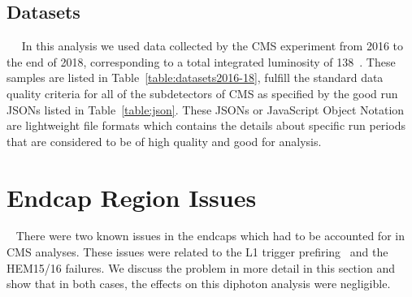 

\subsection{Datasets}~\label{sec:CMSDataRunII}~\label{sec:datasets}
In this analysis we used data collected by the CMS experiment from 2016 to the end of 2018, corresponding to a total integrated luminosity of 138~\fbinv. These samples are listed in Table~\ref{table:datasets2016-18}, fulfill the standard data quality criteria for all of the subdetectors of CMS as specified by the good run JSONs listed in Table~\ref{table:json}. These JSONs or JavaScript Object Notation are lightweight file formats which contains the details about specific run periods that are considered to be of high quality and good for analysis.












\section{Endcap Region Issues}~\label{sec:EEIssues}
There were two known issues in the endcaps which had to be accounted for in CMS analyses. These issues were related to the L1 trigger prefiring~\cite{CMS:2020cmk, CMS_Collaboration_reweighting} and the HEM15/16 failures. We discuss the problem in more detail in this section and show that in both cases, the effects on this diphoton analysis were negligible. 

